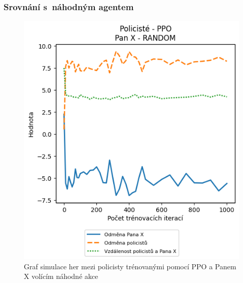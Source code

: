 \subsubsection*{Srovnání s~náhodným agentem}
\begin{figure}[H]
  \begin{minipage}{.48\textwidth}
    \centering
    \includegraphics[width=1\textwidth]{obrazky-figures/graphs/cop_PPO_mrx_RANDOM}
    \caption{Graf simulace her mezi policisty trénovanými pomocí PPO a Panem X volícím náhodné akce}
    \label{fig:cop_ppo_mrx_random}
  \end{minipage}\hfill
  \begin{minipage}{.48\textwidth}
    \centering

\end{minipage}
\end{figure}
